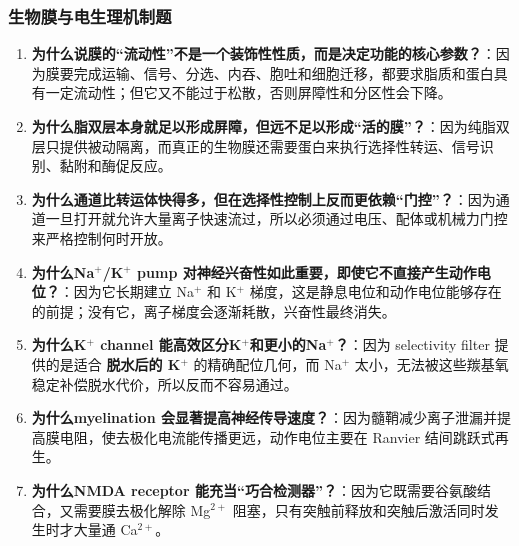 \documentclass[12pt,fontset=none]{ctexart}
\begin{document}
\subsubsection*{生物膜与电生理机制题}
\begin{enumerate}
\item \textbf{为什么说膜的“流动性”不是一个装饰性性质，而是决定功能的核心参数？}：因为膜要完成运输、信号、分选、内吞、胞吐和细胞迁移，都要求脂质和蛋白具有一定流动性；但它又不能过于松散，否则屏障性和分区性会下降。

\item \textbf{为什么脂双层本身就足以形成屏障，但远不足以形成“活的膜”？}：因为纯脂双层只提供被动隔离，而真正的生物膜还需要蛋白来执行选择性转运、信号识别、黏附和酶促反应。

\item \textbf{为什么通道比转运体快得多，但在选择性控制上反而更依赖“门控”？}：因为通道一旦打开就允许大量离子快速流过，所以必须通过电压、配体或机械力门控来严格控制何时开放。

\item \textbf{为什么Na$^+$/K$^+$ pump 对神经兴奋性如此重要，即使它不直接产生动作电位？}：因为它长期建立 Na$^+$ 和 K$^+$ 梯度，这是静息电位和动作电位能够存在的前提；没有它，离子梯度会逐渐耗散，兴奋性最终消失。

\item \textbf{为什么K$^+$ channel 能高效区分K$^+$和更小的Na$^+$？}：因为 selectivity filter 提供的是适合 \textbf{脱水后的 K$^+$} 的精确配位几何，而 Na$^+$ 太小，无法被这些羰基氧稳定补偿脱水代价，所以反而不容易通过。

\item \textbf{为什么myelination 会显著提高神经传导速度？}：因为髓鞘减少离子泄漏并提高膜电阻，使去极化电流能传播更远，动作电位主要在 Ranvier 结间跳跃式再生。

\item \textbf{为什么NMDA receptor 能充当“巧合检测器”？}：因为它既需要谷氨酸结合，又需要膜去极化解除 Mg$^{2+}$ 阻塞，只有突触前释放和突触后激活同时发生时才大量通 Ca$^{2+}$。

\end{enumerate}
\end{document}
